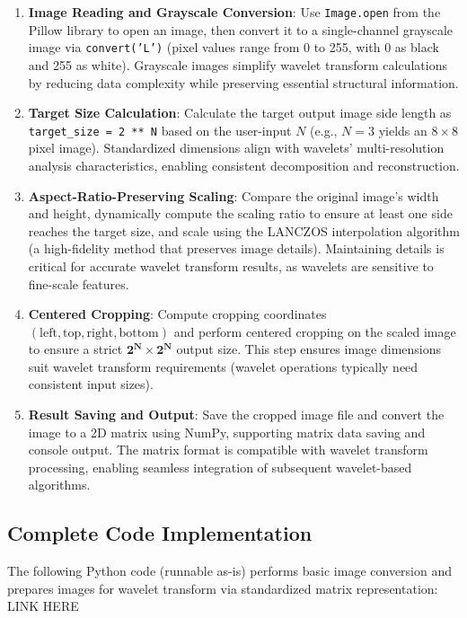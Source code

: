 \documentclass[12pt,a4paper]{article}
\begin{document}
\begin{enumerate}
    \item \textbf{Image Reading and Grayscale Conversion}:  
    Use \texttt{Image.open} from the Pillow library to open an image, then convert it to a single-channel grayscale image via \texttt{convert('L')} (pixel values range from 0 to 255, with 0 as black and 255 as white). Grayscale images simplify wavelet transform calculations by reducing data complexity while preserving essential structural information.  

    \item \textbf{Target Size Calculation}:  
    Calculate the target output image side length as \texttt{target\_size = 2 ** N} based on the user-input \(N\) (e.g., \(N = 3\) yields an \(8 \times 8\) pixel image). Standardized dimensions align with wavelets’ multi-resolution analysis characteristics, enabling consistent decomposition and reconstruction.  

    \item \textbf{Aspect-Ratio-Preserving Scaling}:  
    Compare the original image’s width and height, dynamically compute the scaling ratio to ensure at least one side reaches the target size, and scale using the LANCZOS interpolation algorithm (a high-fidelity method that preserves image details). Maintaining details is critical for accurate wavelet transform results, as wavelets are sensitive to fine-scale features.  

    \item \textbf{Centered Cropping}:  
    Compute cropping coordinates \((\text{left}, \text{top}, \text{right}, \text{bottom})\) and perform centered cropping on the scaled image to ensure a strict \(\mathbf{2^N \times 2^N}\) output size. This step ensures image dimensions suit wavelet transform requirements (wavelet operations typically need consistent input sizes).  

    \item \textbf{Result Saving and Output}:  
    Save the cropped image file and convert the image to a 2D matrix using NumPy, supporting matrix data saving and console output. The matrix format is compatible with wavelet transform processing, enabling seamless integration of subsequent wavelet-based algorithms.  
\end{enumerate}

\subsection{Complete Code Implementation}
The following Python code (runnable as-is) performs basic image conversion and prepares images for wavelet transform via standardized matrix representation:  
LINK HERE
\end{document}
